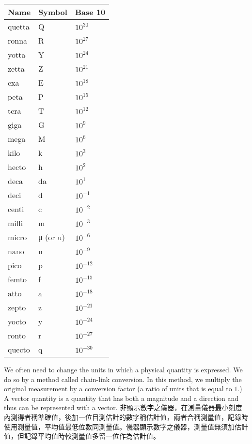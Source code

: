 \documentclass[a4paper,12pt]{article}
\begin{document}
\begin{longtable}[c]{|p{0.15\tw}|p{0.15\tw}|p{0.15\tw}|}
\hline
Name & Symbol & Base 10 \\\hline\endhead
quetta & Q & $10^{30}$ \\\hline
ronna & R & $10^{27}$ \\\hline
yotta & Y & $10^{24}$ \\\hline
zetta & Z & $10^{21}$ \\\hline
exa & E & $10^{18}$ \\\hline
peta & P & $10^{15}$ \\\hline
tera & T & $10^{12}$ \\\hline
giga & G & $10^{9}$ \\\hline
mega & M & $10^{6}$ \\\hline
kilo & k & $10^{3}$ \\\hline
hecto & h & $10^{2}$ \\\hline
deca & da & $10^{1}$ \\\hline
deci & d & $10^{-1}$ \\\hline
centi & c & $10^{-2}$ \\\hline
milli & m & $10^{-3}$ \\\hline
micro & μ (or u) & $10^{-6}$ \\\hline
nano & n & $10^{-9}$ \\\hline
pico & p & $10^{-12}$ \\\hline
femto & f & $10^{-15}$ \\\hline
atto & a & $10^{-18}$ \\\hline
zepto & z & $10^{-21}$ \\\hline
yocto & y & $10^{-24}$ \\\hline
ronto & r & $10^{-27}$ \\\hline
quecto & q & $10^{-30}$ \\\hline
\end{longtable}\FB
{}
We often need to change the units in which a physical quantity is expressed. We do so by a method called chain-link conversion. In this method, we multiply the original measurement by a conversion factor (a ratio of units that is equal to $1$.)
A vector quantity is a quantity that has both a magnitude and a direction and thus can be represented with a vector.
非顯示數字之儀器，在測量儀器最小刻度內測得者稱準確值，後加一位目測估計的數字稱估計值，兩者合稱測量值，記錄時使用測量值，平均值最低位數同測量值。儀器顯示數字之儀器，測量值無須加估計值，但記錄平均值時較測量值多留一位作為估計值。
\end{document}
